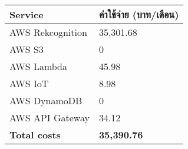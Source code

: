  \begin{center}
    \begin{tabular}{ | m{5cm} | m{4cm}| } 
      \hline
      \textbf{Service} & \textbf{ค่าใช้จ่าย (บาท/เดือน)} \\ 
      \hline
      AWS Rekcognition & 35,301.68\\ 
      \hline
      AWS S3 & 0\\
      \hline
      AWS Lambda & 45.98\\
      \hline
      AWS IoT & 8.98\\
      \hline
      AWS DynamoDB & 0\\
      \hline
      AWS API Gateway & 34.12\\
      \hline
      \textbf{Total costs} & \textbf{35,390.76}\\
      \hline
    \end{tabular}
    \end{center}
